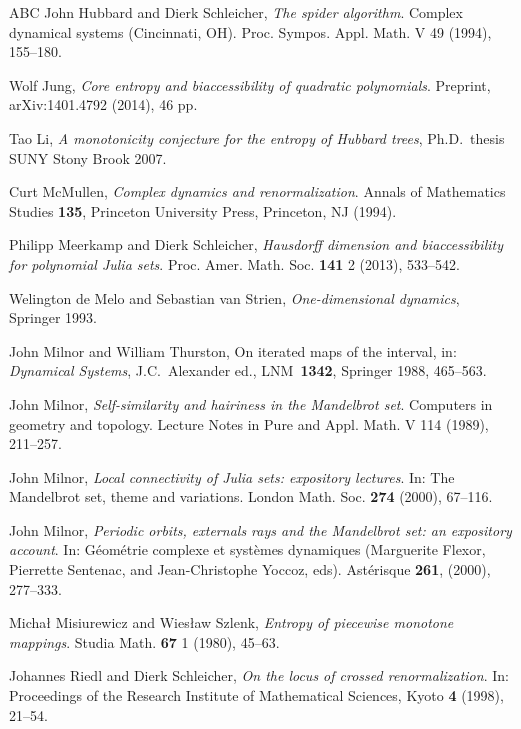 \documentclass[12pt]{amsart}
\newcommand{\0}{\texttt{0}}
\newcommand{\1}{\texttt{1}}
\theoremstyle{definition}
\numberwithin{equation}{section}
\begin{document}
\begin{thebibliography}{ABC}
 John Hubbard and Dierk Schleicher,
   \emph{The spider algorithm}. Complex dynamical systems
   ({C}incinnati, {OH}). Proc. Sympos. Appl. Math. V 49 (1994), 155--180.

 Wolf Jung, \emph{Core entropy and biaccessibility of
   quadratic polynomials}. Preprint, arXiv:1401.4792 (2014), 46 pp.

 Tao Li, \emph{A monotonicity conjecture for the entropy of
   Hubbard trees}, Ph.D.~thesis SUNY Stony Brook 2007.

 Curt McMullen, \emph{Complex dynamics and
   renormalization}. Annals of Mathematics Studies \textbf{135}, 
   Princeton University Press, Princeton, NJ (1994).

 Philipp Meerkamp and Dierk Schleicher, 
   \emph{Hausdorff dimension and biaccessibility for polynomial Julia sets}.
   {Proc. Amer. Math. Soc.}  \textbf{141} 2 (2013), 533--542.

 Welington de Melo and Sebastian van Strien,
   \emph{One-dimensional dynamics}, Springer 1993.

 John Milnor and William Thurston, On iterated maps
   of the interval, in: \emph{Dynamical Systems},
   J.C.~Alexander ed., LNM~\textbf{1342}, Springer 1988, 465--563.

 John Milnor, \emph{Self-similarity and hairiness in the
   {M}andelbrot set}. Computers in geometry and topology.
   Lecture Notes in Pure and Appl. Math. V 114 (1989), 211--257.

 John Milnor, \emph{Local connectivity of {J}ulia sets:
   expository lectures}. In: The {M}andelbrot set, theme and variations.
   London Math. Soc. \textbf{274} (2000), 67--116.

 John Milnor, \emph{Periodic orbits, externals rays and
   the Mandelbrot set: an expository account}. In:
   G\'eom\'etrie complexe et syst\`emes dynamiques (Marguerite Flexor,
   Pierrette Sentenac, and Jean-Christophe Yoccoz, eds).
   Ast\'erisque \textbf{ 261}, (2000), 277--333. 

Micha{\l} Misiurewicz and Wies{\l}aw Szlenk,
\emph{Entropy of piecewise monotone mappings}.
Studia Math. \textbf{67} 1 (1980), 45--63. 

Johannes Riedl and Dierk Schleicher,
\emph{On the locus of crossed renormalization}. In: Proceedings of 
the Research Institute of Mathematical Sciences, Kyoto \textbf{4} (1998), 21--54. 



\end{thebibliography}
\end{document}
